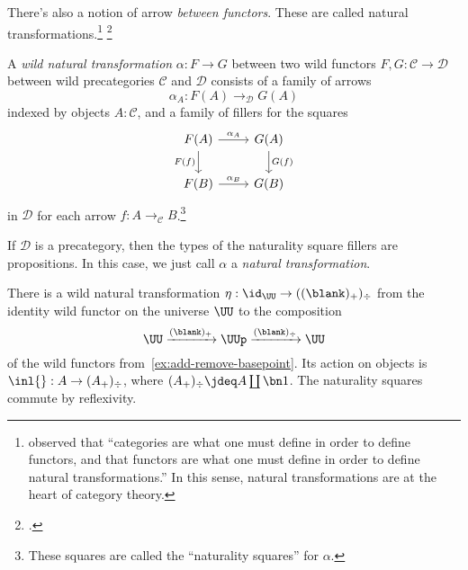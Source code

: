 There's also a notion of arrow \emph{between functors}.
These are called natural transformations.\footnote{%
  \citeauthor{Freyd1964}\footnotemark{} observed that ``categories are what one must define
  in order to define functors, and that functors are what one must define
  in order to define natural transformations.''
  In this sense, natural transformations are at the heart of category theory.}%
\footcitetext{Freyd1964}
\begin{definition}
  A \emph{wild natural transformation}
  $\alpha : F \to G$ between
  two wild functors $F,G : \mathcal C \to \mathcal D$ between
  wild precategories $\mathcal C$ and $\mathcal D$
  consists of a family of arrows
  \[
    \alpha_A : F(A) \to_{\mathcal D} G(A)
  \]
  indexed by objects $A:\mathcal C$,
  and a family of fillers for the squares
  \[
    \begin{tikzcd}
      F(A) \ar[r,"\alpha_A"]\ar[d,"F(f)"'] & G(A) \ar[d,"G(f)"] \\
      F(B) \ar[r,"\alpha_B"] & G(B)
    \end{tikzcd}
  \]
  in $\mathcal D$
  for each arrow $f : A \to_{\mathcal C} B$.\footnote{%
    These squares are called the ``naturality squares'' for $\alpha$.}

  If $\mathcal D$ is a precategory, then the types of the naturality square fillers
  are propositions. In this case, we just call $\alpha$ a \emph{natural transformation}.
\end{definition}
\begin{example}
  There is a wild
  natural transformation $\eta : \id_{\UU} \to ((\blank)_+)_\div$
  from the identity wild functor on the universe $\UU$
  to the composition
  \[
    \UU \xrightarrow{(\blank)_+} \UUp \xrightarrow{(\blank)_\div} \UU
  \]
  of the wild functors from~\cref{ex:add-remove-basepoint}.
  Its action on objects is $\inl{} : A \to (A_+)_\div$,
  where $(A_+)_\div \jdeq A \coprod\bn 1$.
  The naturality squares commute by reflexivity.
\end{example}

